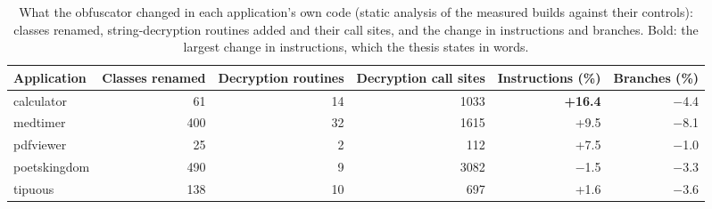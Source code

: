 \begin{table}[t]
\centering
\small
\caption{What the obfuscator changed in each application's own code (static analysis of the measured builds against their controls): classes renamed, string-decryption routines added and their call sites, and the change in instructions and branches. Bold: the largest change in instructions, which the thesis states in words.}
\label{tab:obfuscation-static}
\begin{tabular}{lrrrrr}
\toprule
\textbf{Application} & \textbf{Classes renamed} & \textbf{Decryption routines} & \textbf{Decryption call sites} & \textbf{Instructions (\%)} & \textbf{Branches (\%)} \\
\midrule
calculator & 61 & 14 & 1033 & \textbf{+16.4} & $-$4.4 \\
medtimer & 400 & 32 & 1615 & +9.5 & $-$8.1 \\
pdfviewer & 25 & 2 & 112 & +7.5 & $-$1.0 \\
poetskingdom & 490 & 9 & 3082 & $-$1.5 & $-$3.3 \\
tipuous & 138 & 10 & 697 & +1.6 & $-$3.6 \\
\bottomrule
\end{tabular}
\end{table}
